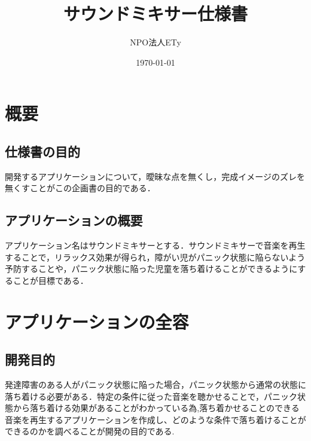 \documentclass{jarticle}
\title{サウンドミキサー仕様書}
\author{NPO法人ETy}
\date{\today}
\begin{document}
\maketitle
\section{概要}
\subsection{仕様書の目的}
開発するアプリケーションについて，曖昧な点を無くし，完成イメージのズレを無くすことがこの企画書の目的である．
\subsection{アプリケーションの概要}
アプリケーション名はサウンドミキサーとする．サウンドミキサーで音楽を再生することで，リラックス効果が得られ，障がい児がパニック状態に陥らないよう予防することや，パニック状態に陥った児童を落ち着けることができるようにすることが目標である．

\section{アプリケーションの全容}
\subsection{開発目的}
発達障害のある人がパニック状態に陥った場合，パニック状態から通常の状態に落ち着ける必要がある．特定の条件に従った音楽を聴かせることで，パニック状態から落ち着ける効果があることがわかっている為,落ち着かせることのできる音楽を再生するアプリケーションを作成し、どのような条件で落ち着けることができるのかを調べることが開発の目的である.
\end{document}
